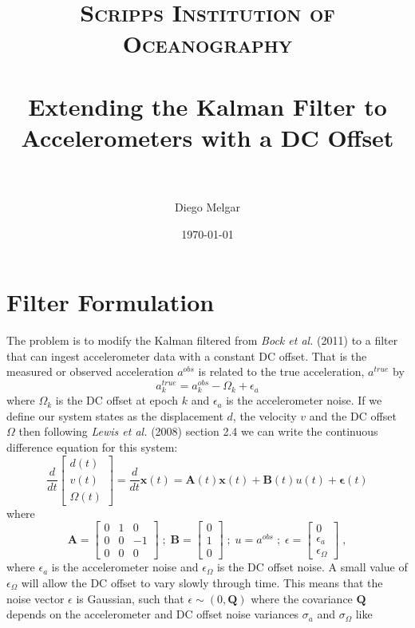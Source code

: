 \documentclass[paper=a4, fontsize=11pt]{scrartcl} %
\title{	
\normalfont \normalsize 
\textsc{Scripps Institution of Oceanography} \\ [25pt] %
\horrule{0.5pt} \\[0.4cm] %
\huge Extending the Kalman Filter to Accelerometers with a DC Offset \\ %
\horrule{2pt} \\[0.5cm] %
}
\author{Diego Melgar} %
\date{\normalsize\today} %
\numberwithin{equation}{section} %
\numberwithin{figure}{section} %
\numberwithin{table}{section} %
\begin{document}
\maketitle %


\section{Filter Formulation}

The problem is to modify the Kalman filtered from \textit{Bock et al.} (2011) to a filter that can ingest accelerometer data with a constant DC offset. That is the measured or observed acceleration $a^{obs}$ is related to the true acceleration, $a^{true}$ by
$$
a_k^{true}=a_k^{obs}-\Omega_k+\epsilon_a
$$
where $\Omega_k$ is the DC offset at epoch $k$ and $\epsilon_a$ is the accelerometer noise. If we define our system states as the displacement $d$, the velocity $v$ and the DC offset $\Omega$ then following \textit{Lewis et al.} (2008) section 2.4 we can write the continuous difference equation for this system:
$$
\frac{d}{dt}
\left[\begin{matrix}
  d(t) \\
  v(t) \\
  \Omega(t)
\end{matrix}\right]
=\frac{d}{dt}\mathbf{x}(t)
=\mathbf{A}(t)\mathbf{x}(t)+\mathbf{B}(t)u(t)+\mathbf{\epsilon}(t)
$$
where
$$
\mathbf{A}=
\left[\begin{matrix}
0 & 1 & 0 \\
0 & 0 & -1 \\
0 & 0 & 0
\end{matrix}\right]
\;;\;
\mathbf{B}=
\left[\begin{matrix}
0 \\
1 \\
0
\end{matrix}\right]\;;\;u=a^{obs}\;;\;\epsilon=
\left[\begin{matrix}
0 \\
\epsilon_a\\
\epsilon_\Omega
\end{matrix}\right]\;,
$$
where $\epsilon_a$ is the accelerometer noise and $\epsilon_\Omega$ is the DC offset noise. A small value of $\epsilon_\Omega$ will allow the DC offset to vary slowly through time. This means that the noise vector $\epsilon$ is Gaussian, such that $\epsilon\sim(0,\mathbf{Q})$ where the covariance $\mathbf{Q}$ depends on the accelerometer and DC offset noise variances $\sigma_a$ and $\sigma_\Omega$ like
\end{document}
